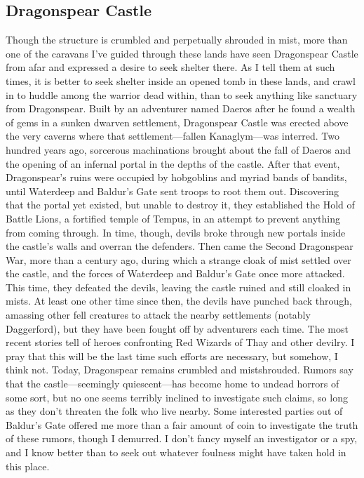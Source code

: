 \documentclass[10pt,a4paper,twoside,twocolumn,openany,bg=print,nodeprecatedcode]{dndbook}
\begin{document}
\subsection{Dragonspear Castle}
Though the structure is crumbled and perpetually shrouded in mist, more than one of the caravans I've guided through these lands have seen Dragonspear Castle from afar and expressed a desire to seek shelter there. As I tell them at such times, it is better to seek shelter inside an opened tomb in these lands, and crawl in to huddle among the warrior dead within, than to seek anything like sanctuary from Dragonspear.
Built by an adventurer named Daeros after he found a wealth of gems in a sunken dwarven settlement, Dragonspear Castle was erected above the very caverns where that settlement—fallen Kanaglym—was interred. Two hundred years ago, sorcerous machinations brought about the fall of Daeros and the opening of an infernal portal in the depths of the castle.
After that event, Dragonspear's ruins were occupied by hobgoblins and myriad bands of bandits, until Waterdeep and Baldur's Gate sent troops to root them out. Discovering that the portal yet existed, but unable to destroy it, they established the Hold of Battle Lions, a fortified temple of Tempus, in an attempt to prevent anything from coming through. In time, though, devils broke through new portals inside the castle's walls and overran the defenders.
Then came the Second Dragonspear War, more than a century ago, during which a strange cloak of mist settled over the castle, and the forces of Waterdeep and Baldur's Gate once more attacked. This time, they defeated the devils, leaving the castle ruined and still cloaked in mists. At least one other time since then, the devils have punched back through, amassing other fell creatures to attack the nearby settlements (notably Daggerford), but they have been fought off by adventurers each time. The most recent stories tell of heroes confronting Red Wizards of Thay and other devilry. I pray that this will be the last time such efforts are necessary, but somehow, I think not.
Today, Dragonspear remains crumbled and mistshrouded. Rumors say that the castle—seemingly quiescent—has become home to undead horrors of some sort, but no one seems terribly inclined to investigate such claims, so long as they don't threaten the folk who live nearby. Some interested parties out of Baldur's Gate offered me more than a fair amount of coin to investigate the truth of these rumors, though I demurred. I don't fancy myself an investigator or a spy, and I know better than to seek out whatever foulness might have taken hold in this place.
\end{document}
